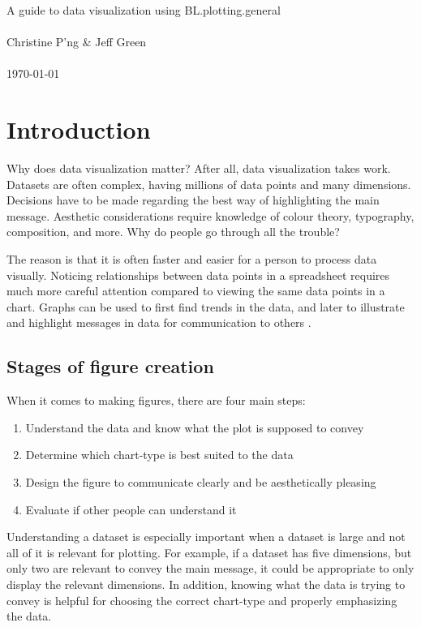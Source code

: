 \documentclass[letterpaper]{article}\usepackage[]{graphicx}\usepackage[]{color}
\begin{document}
\begin{center}
	\LARGE{A guide to data visualization using BL.plotting.general}\\~\\
	\large{Christine P'ng \& Jeff Green}\\~\\
	\large{\today}
\end{center}
\tableofcontents

\newpage
\section{Introduction}
Why does data visualization matter? After all, data visualization takes work. Datasets are often complex, having millions of data points and many dimensions. Decisions have to be made regarding the best way of highlighting the main message. Aesthetic considerations require knowledge of colour theory, typography, composition, and more. Why do people go through all the trouble?

The reason is that it is often faster and easier for a person to process data visually. Noticing relationships between data points in a spreadsheet requires much more careful attention compared to viewing the same data points in a chart. Graphs can be used to first find trends in the data, and later to illustrate and highlight messages in data for communication to others \cite{Anscombe, wong-dataexploration}.

\subsection{Stages of figure creation}
When it comes to making figures, there are four main steps:
\begin{enumerate}
\item Understand the data and know what the plot is supposed to convey
\item Determine which chart-type is best suited to the data
\item Design the figure to communicate clearly and be aesthetically pleasing
\item Evaluate if other people can understand it
\end{enumerate}

Understanding a dataset is especially important when a dataset is large and not all of it is relevant for plotting. For example, if a dataset has five dimensions, but only two are relevant to convey the main message, it could be appropriate to only display the relevant dimensions. In addition, knowing what the data is trying to convey is helpful for choosing the correct chart-type and properly emphasizing the data. 
\end{document}
